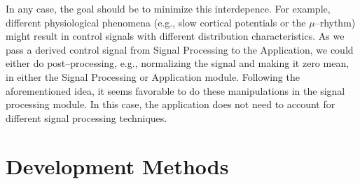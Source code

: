 In any case, the goal should be to minimize this interdepence. For example, 
different physiological phenomena (e.g., slow cortical potentials or the 
$\mu$--rhythm) might result in control signals with different distribution 
characteristics. As we pass a derived control signal from Signal Processing to 
the Application, we could either do post--processing, e.g., normalizing the 
signal and making it zero mean, in either the Signal Processing or Application 
module. Following the aforementioned idea, it seems favorable to do these 
manipulations in the signal processing module. In this case, the application 
does not need to account for different signal processing techniques.





\section{Development Methods}



